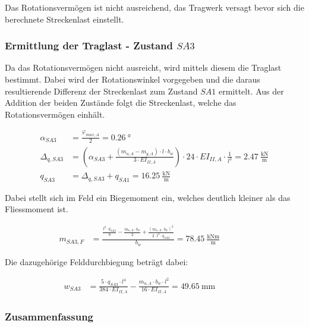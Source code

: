 \documentclass[
  11pt,
  letterpaper,
]{scrreprt}
\begin{document}
Das Rotationsvermögen ist nicht ausreichend, das Tragwerk versagt bevor
sich die berechnete Streckenlast einstellt.

\subsubsection{\texorpdfstring{Ermittlung der Traglast - Zustand
\(SA3\)}{Ermittlung der Traglast - Zustand SA3}}\label{ermittlung-der-traglast---zustand-sa3}

Da das Rotationsvermögen nicht ausreicht, wird mittels diesem die
Traglast bestimmt. Dabei wird der Rotationswinkel vorgegeben und die
daraus resultierende Differenz der Streckenlast zum Zustand \(SA1\)
ermittelt. Aus der Addition der beiden Zustände folgt die Streckenlast,
welche das Rotationsvermögen einhält.

\[
\begin{aligned}
\alpha_{SA3}& = \frac{\varphi_{max , A}}{2} = 0.26 \ \mathrm{°} \\ 
\Delta_{q , SA3}& = \left(\alpha_{SA3} + \frac{\left(m_{u , A} - m_{y , A}\right) \cdot l \cdot b_{w}}{3 \cdot EI_{II , A}}\right) \cdot 24 \cdot EI_{II , A} \cdot \frac{1}{l^{3}} = 2.47 \ \frac{\mathrm{kN}}{\mathrm{m}} \\ 
q_{SA3}& = \Delta_{q , SA3} + q_{SA1} = 16.25 \ \frac{\mathrm{kN}}{\mathrm{m}} \end{aligned}
\]

Dabei stellt sich im Feld ein Biegemoment ein, welches deutlich kleiner
als das Fliessmoment ist.

\[
\begin{aligned}
m_{SA3 , F}& = \frac{\frac{l^{2} \cdot q_{SA3}}{8} - \frac{m_{u , A} \cdot b_{w}}{2} + \frac{\left(m_{u , A} \cdot b_{w}\right)^{2}}{2 \cdot l^{2} \cdot q_{SA3}}}{b_{w}} = 78.45 \ \frac{\mathrm{kNm}}{\mathrm{m}} \quad &  \quad &  
 \end{aligned}
\]

Die dazugehörige Felddurchbiegung beträgt dabei:

\[
\begin{aligned}
w_{SA3}& = \frac{5 \cdot q_{SA3} \cdot l^{4}}{384 \cdot EI_{II , A}} - \frac{m_{u , A} \cdot b_{w} \cdot l^{2}}{16 \cdot EI_{II , A}} = 49.65 \ \mathrm{mm} \quad &  \quad &  
 \end{aligned}
\]

\subsubsection{Zusammenfassung}\label{zusammenfassung-2}
\end{document}
